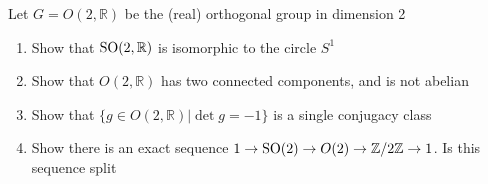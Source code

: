 \documentclass[main]{subfiles}
\begin{document}
\begin{exercise}
Let $G=O(2,\mathbb R)$ be the (real) orthogonal group in dimension 2
\begin{enumerate}[label=(\alph*),leftmargin=*]
\item Show that $\operatorname{SO}(2,\mathbb R)$ is isomorphic to the circle $S^1$
\item Show that $O(2,\mathbb R)$ has two connected components, and is not abelian
\item Show that $\{g\in O(2,\mathbb R)|\det g=-1\}$ is a single conjugacy class
\item Show there is an exact sequence $1\to \operatorname{SO}(2)\to O(2)\to\mathbb Z/2\mathbb Z\to1$. Is this sequence split
\end{enumerate}
\end{exercise}
\end{document}
